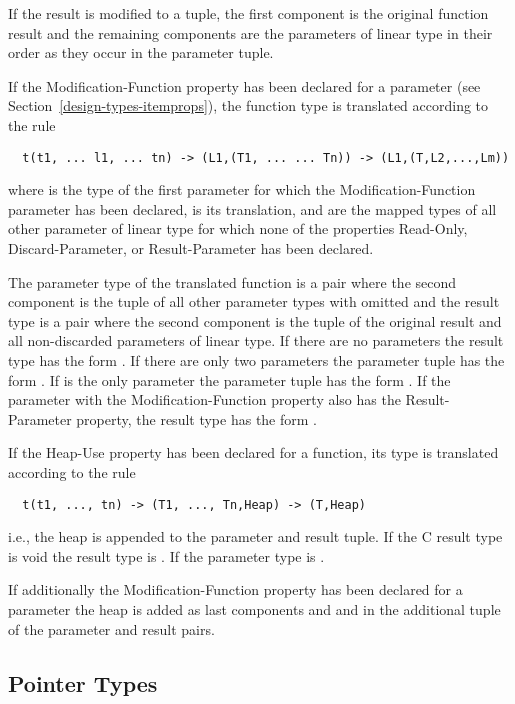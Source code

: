 If the result is modified to a tuple, the first component is the original function result and the remaining components
are the parameters of linear type in their order as they occur in the parameter tuple.

If the Modification-Function property has been declared for a parameter (see Section~\ref{design-types-itemprops}), 
the function type is translated according to the rule
\begin{verbatim}
  t(t1, ... l1, ... tn) -> (L1,(T1, ... ... Tn)) -> (L1,(T,L2,...,Lm))
\end{verbatim}
where  is the type of the first parameter for which the Modification-Function parameter has been declared, 
is its translation, and  are the mapped types of all other parameter of linear type for which none of the 
properties Read-Only, Discard-Parameter, or Result-Parameter has been declared. 

The parameter type of
the translated function is a pair where the second component is the tuple of all other parameter types with 
omitted and the result type is a pair where the second component is the tuple of the original result and all non-discarded
parameters of linear type. If there are no parameters  the result type has the form . If there
are only two parameters the parameter tuple has the form . If  is the only parameter the parameter tuple
has the form . If the parameter with the Modification-Function
property also has the Result-Parameter property, the result type has the form .

If the Heap-Use property has been declared for a function, its type is translated according to the rule
\begin{verbatim}
  t(t1, ..., tn) -> (T1, ..., Tn,Heap) -> (T,Heap)
\end{verbatim}
i.e., the heap is appended to the parameter and result tuple. If the C result type is void the result type is .
If  the parameter type is .

If additionally the Modification-Function property has been declared for a parameter the heap is added as last components  and
and  in the additional tuple of the parameter and result pairs.

\subsection{Pointer Types}
\label{design-types-pointer}

